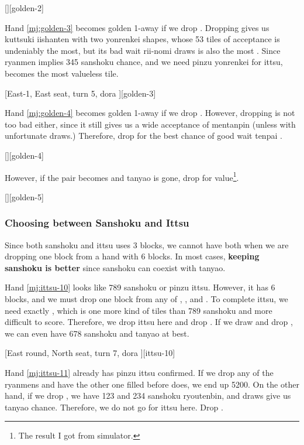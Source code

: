 \documentclass[12pt]{article}
\begin{document}
[][golden-2]

Hand \ref{mj:golden-3} becomes golden 1-away if we drop . Dropping  gives us kuttsuki iishanten with two yonrenkei shapes, whose 53 tiles of acceptance is undeniably the most, but its bad wait rii-nomi draws is also the most \citep{shibukawa-ssk}. Since  ryanmen implies 345 sanshoku chance, and we need pinzu yonrenkei for ittsu,  becomes the most valueless tile.

[East-1, East seat, turn 5, dora ][golden-3]

Hand \ref{mj:golden-4} becomes golden 1-away if we drop . However, dropping  is not too bad either, since it still gives us a wide acceptance of mentanpin (unless with unfortunate  draws.) Therefore, drop  for the best chance of good wait tenpai \citep{gendai-ittsu}.

[][golden-4]

However, if the pair becomes  and tanyao is gone, drop  for value\footnote{The result I got from simulator.}.

[][golden-5]


\subsubsection*{Choosing between Sanshoku and Ittsu}

Since both sanshoku and ittsu uses 3 blocks, we cannot have both when we are dropping one block from a hand with 6 blocks. In most cases, \textbf{keeping sanshoku is better} \citep{gendai-ittsu} since sanshoku can coexist with tanyao.

Hand \ref{mj:ittsu-10} looks like 789 sanshoku or pinzu ittsu. However, it has 6 blocks, and we must drop one block from any of , , and . To complete ittsu, we need exactly , which is one more kind of tiles than 789 sanshoku and more difficult to score. Therefore, we drop ittsu here and drop . If we draw  and drop , we can even have 678 sanshoku and tanyao at best.

[East round, North seat, turn 7, dora ][ittsu-10]

Hand \ref{mj:ittsu-11} already has pinzu ittsu confirmed. If we drop any of the ryanmens and have the other one filled before  does, we end up 5200. On the other hand, if we drop , we have 123 and 234 sanshoku ryoutenbin, and  draws give us tanyao chance. Therefore, we do not go for ittsu here. Drop .
\end{document}

